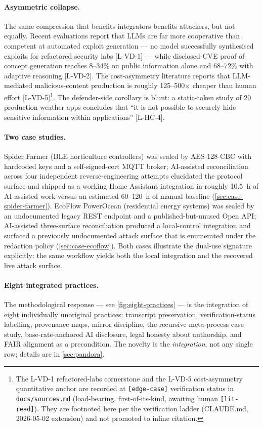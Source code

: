 \documentclass[11pt,a4paper]{article}
\begin{document}
\paragraph{Asymmetric collapse.} The same compression that benefits
integrators benefits attackers, but not equally. Recent evaluations report
that LLMs are far more cooperative than competent at automated exploit
generation --- no model successfully synthesised exploits for refactored
security labs [L-VD-1] --- while disclosed-CVE proof-of-concept generation
reaches 8--34\% on public information alone and 68--72\% with adaptive
reasoning [L-VD-2]. The cost-asymmetry literature reports that
LLM-mediated malicious-content production is roughly 125--500$\times$
cheaper than human effort [L-VD-5]\footnote{The L-VD-1 refactored-labs
cornerstone and the L-VD-5 cost-asymmetry quantitative anchor are recorded
at \texttt{[edge-case]} verification status in \texttt{docs/sources.md}
(load-bearing, first-of-its-kind, awaiting human \texttt{[lit-read]}). They
are footnoted here per the verification ladder (CLAUDE.md, 2026-05-02
extension) and not promoted to inline citation.}. The defender-side
corollary is blunt: a static-token study of 20 production weather apps
concludes that ``it is not possible to securely hide sensitive information
within applications'' [L-HC-4].

\paragraph{Two case studies.} Spider Farmer (BLE horticulture controllers)
was sealed by AES-128-CBC with hardcoded keys and a self-signed-cert MQTT
broker; AI-assisted reconciliation across four independent
reverse-engineering attempts elucidated the protocol surface and shipped
as a working Home Assistant integration in roughly 10.5~h of AI-assisted
work versus an estimated 60--120~h of manual baseline
(\cref{sec:case-spider-farmer}). EcoFlow PowerOcean (residential energy
systems) was sealed by an undocumented legacy REST endpoint and a
published-but-unused Open API; AI-assisted three-surface reconciliation
produced a local-control integration and surfaced a previously
undocumented attack surface that is enumerated under the redaction policy
(\cref{sec:case-ecoflow}). Both cases illustrate the dual-use signature
explicitly: the same workflow yields both the local integration and the
recovered live attack surface.

\paragraph{Eight integrated practices.} The methodological response ---
see \cref{fig:eight-practices} --- is the integration of eight
individually unoriginal practices: transcript preservation,
verification-status labelling, provenance maps, mirror discipline, the
recursive meta-process case study, base-rate-anchored AI disclosure, legal
honesty about authorship, and FAIR alignment as a precondition. The
novelty is the \emph{integration}, not any single row; details are in
\cref{sec:pandora}.
\end{document}
